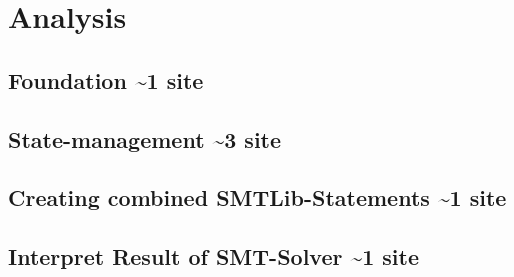 \section{Analysis}
\subsection{Foundation \textasciitilde 1 site}
\subsection{State-management \textasciitilde 3 site}
\subsection{Creating combined SMTLib-Statements \textasciitilde 1 site}
\subsection{Interpret Result of SMT-Solver \textasciitilde 1 site}
